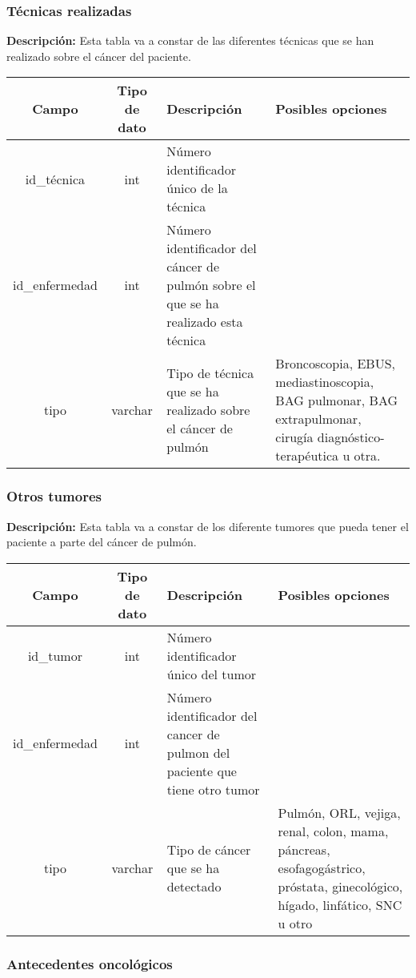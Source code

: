 \subsubsection{Técnicas realizadas}

\textbf{Descripción:} Esta tabla va a constar de las diferentes técnicas que se han realizado sobre el cáncer del paciente.

\begin{longtable}{|c |c |p{4.7cm} |p{3.1cm} |}
\hline
Campo & Tipo de dato & Descripción & Posibles opciones\\ \hline
id\_técnica & int &  Número identificador único de la técnica & \\\hline
id\_enfermedad & int & Número identificador del cáncer de pulmón sobre el que se ha realizado esta técnica & \\\hline
tipo & varchar & Tipo de técnica que se ha realizado sobre el cáncer de pulmón & Broncoscopia, EBUS, mediastinoscopia, BAG pulmonar, BAG extrapulmonar, cirugía diagnóstico-terapéutica u otra.\\ \hline
\end{longtable}

\subsubsection{Otros tumores}

\textbf{Descripción:} Esta tabla va a constar de los diferente tumores que pueda tener el paciente a parte del cáncer de pulmón. 

\begin{longtable}{|c |c |p{4.7cm} |p{3.1cm} |}
\hline
Campo & Tipo de dato & Descripción & Posibles opciones\\ \hline
id\_tumor & int & Número identificador único del tumor  & \\\hline
id\_enfermedad & int &Número identificador del cancer de pulmon del paciente que tiene otro tumor & \\\hline
tipo & varchar & Tipo de cáncer que se ha detectado & Pulmón, ORL, vejiga, renal, colon, mama, páncreas, esofagogástrico, próstata, ginecológico, hígado, linfático, SNC u otro\\ \hline
\end{longtable}

\subsubsection{Antecedentes oncológicos}

